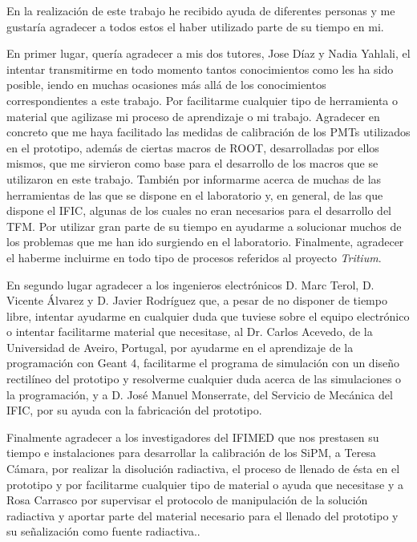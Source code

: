 En la realización de este trabajo he recibido ayuda de diferentes personas y me gustaría agradecer a todos estos el haber utilizado parte de su tiempo en mi.

En primer lugar, quería agradecer a mis dos tutores, Jose Díaz y Nadia Yahlali, el intentar transmitirme en todo momento tantos conocimientos como les ha sido posible, iendo en muchas ocasiones más allá de los conocimientos correspondientes a este trabajo. Por facilitarme cualquier tipo de herramienta o material que agilizase mi proceso de aprendizaje o mi trabajo. Agradecer en concreto que me haya facilitado las medidas de calibración de los PMTs utilizados en el prototipo, además de ciertas macros de ROOT, desarrolladas por ellos mismos, que me sirvieron como base para el desarrollo de los macros que se utilizaron en este trabajo. También por informarme acerca de muchas de las herramientas de las que se dispone en el laboratorio y, en general, de las que dispone el IFIC, algunas de los cuales no eran necesarios para el desarrollo del TFM. Por utilizar gran parte de su tiempo en ayudarme a solucionar muchos de los problemas que me han ido surgiendo en el laboratorio. Finalmente, agradecer el haberme incluirme en todo tipo de procesos referidos al proyecto \textit{Tritium}. 



En segundo lugar agradecer a los ingenieros electrónicos D. Marc Terol, D. Vicente Álvarez  y D. Javier Rodríguez que, a pesar de no disponer de tiempo libre, intentar ayudarme en cualquier duda que tuviese sobre el equipo electrónico o intentar facilitarme material que necesitase, al Dr.  Carlos Acevedo, de la Universidad de Aveiro, Portugal, por ayudarme en el aprendizaje de la programación con Geant 4, facilitarme el programa de simulación con un diseño rectilíneo del prototipo y resolverme cualquier duda acerca de las simulaciones o la programación, y a  D.  José Manuel Monserrate, del Servicio de Mecánica del IFIC, por su ayuda con la fabricación del prototipo.

Finalmente agradecer a los investigadores del IFIMED que nos prestasen su tiempo e instalaciones para desarrollar la calibración de los SiPM, a Teresa Cámara,  por realizar la disolución radiactiva, el proceso de llenado de ésta en el prototipo y por facilitarme cualquier tipo de material o ayuda que necesitase y  a Rosa Carrasco por supervisar el protocolo de manipulación de la solución radiactiva y aportar parte del material necesario para el llenado del prototipo y su señalización como fuente radiactiva..